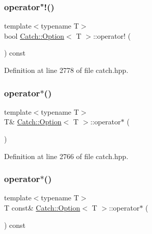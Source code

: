 \subsubsection{\texorpdfstring{operator"!()}{operator!()}}
{\footnotesize\ttfamily template$<$typename T$>$ \\
bool \hyperlink{class_catch_1_1_option}{Catch\+::\+Option}$<$ T $>$\+::operator! (\begin{DoxyParamCaption}{ }\end{DoxyParamCaption}) const\hspace{0.3cm}{\ttfamily [inline]}}



Definition at line 2778 of file catch.\+hpp.

\hypertarget{class_catch_1_1_option_afd989852fa453731c3190dac63caccb0}{}\label{class_catch_1_1_option_afd989852fa453731c3190dac63caccb0} 
\subsubsection{\texorpdfstring{operator$\ast$()}{operator*()}\hspace{0.1cm}{\footnotesize\ttfamily [1/2]}}
{\footnotesize\ttfamily template$<$typename T$>$ \\
T\& \hyperlink{class_catch_1_1_option}{Catch\+::\+Option}$<$ T $>$\+::operator$\ast$ (\begin{DoxyParamCaption}{ }\end{DoxyParamCaption})\hspace{0.3cm}{\ttfamily [inline]}}



Definition at line 2766 of file catch.\+hpp.

\hypertarget{class_catch_1_1_option_a734fc9c2eb1a1f7f8e8f6a4eb12160f0}{}\label{class_catch_1_1_option_a734fc9c2eb1a1f7f8e8f6a4eb12160f0} 
\subsubsection{\texorpdfstring{operator$\ast$()}{operator*()}\hspace{0.1cm}{\footnotesize\ttfamily [2/2]}}
{\footnotesize\ttfamily template$<$typename T$>$ \\
T const\& \hyperlink{class_catch_1_1_option}{Catch\+::\+Option}$<$ T $>$\+::operator$\ast$ (\begin{DoxyParamCaption}{ }\end{DoxyParamCaption}) const\hspace{0.3cm}{\ttfamily [inline]}}



